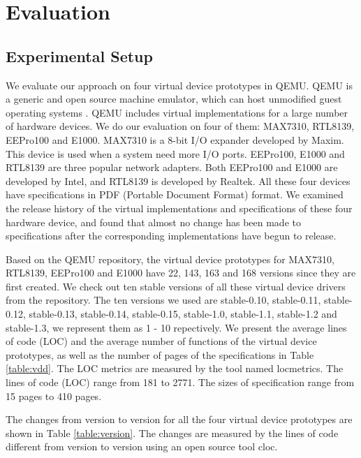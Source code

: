 \section{Evaluation}
\label{sec:evaluation}

\subsection{Experimental Setup}
We evaluate our approach on four virtual device prototypes in QEMU. QEMU is a generic and open source machine emulator, which can host unmodified guest operating systems \cite{bellard_qemuwiki_2013} \cite{bellard_qemu_2005}. QEMU includes virtual implementations for a large number of hardware devices. We do our evaluation on four of them: MAX7310, RTL8139, EEPro100 and E1000. MAX7310 is a 8-bit I/O expander developed by Maxim. This device is used when a system need more I/O ports. EEPro100, E1000 and RTL8139 are three popular network adapters. Both EEPro100 and E1000 are developed by Intel, and RTL8139 is developed by Realtek. All these four devices have specifications in PDF (Portable Document Format) format. We examined the release history of the virtual implementations and specifications of these four hardware device, and found that almost no change has been made to specifications after the corresponding implementations have begun to release.

Based on the QEMU repository, the virtual device prototypes for MAX7310, RTL8139, EEPro100 and E1000 have 22, 143, 163 and 168 versions since they are first created. We check out ten stable versions of all these virtual device drivers from the repository. 
The ten versions we used are stable-0.10, stable-0.11, stable-0.12, stable-0.13, stable-0.14, stable-0.15, stable-1.0, stable-1.1, stable-1.2 and stable-1.3, we represent them as 1 - 10 repectively.
We present the average lines of code (LOC) and the average number of functions of the virtual device prototypes, as well as the number of pages of the specifications in Table \ref{table:vdd}.
The LOC metrics are measured by the tool named locmetrics.
The lines of code (LOC) range from 181 to 2771. The sizes of specification range from 15 pages to 410 pages.

The changes from version to version for all the four virtual device prototypes are shown in Table \ref{table:version}. The changes are measured by the lines of code different from version to version using an open source tool cloc.


